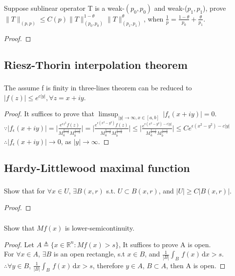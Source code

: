 \documentclass{amsart}
\theoremstyle{definition}
\theoremstyle{remark}
\numberwithin{equation}{section}
\begin{document}
\subsubsection{}
Suppose sublinear operator T is a weak-$(p_0,p_0)$ and weak-($p_1,p_1$), prove $\|T\|_(p,p)\leq C(p)\|T\|_{(p_0,p_0)}^{1-\theta}\|T\|_{(p_1,p_1)}^\theta$, when $\frac{1}{p}=\frac{1-\theta}{p_0}+\frac{\theta}{p_1}$.
\begin{proof}
\end{proof}
\subsection{Riesz-Thorin interpolation theorem}
\subsubsection{}
The assume f is finity in three-lines theorem can be reduced to $|f(z)|\leq e^{c|y|}, \forall z=x+iy$.
\begin{proof}
It suffices to prove that $\displaystyle\limsup_{|y|\to \infty, x\in [a,b]}\,|f_\epsilon(x+iy)|=0$.\\
$\displaystyle\because|f_\epsilon(x+iy)|=\bigg|\frac{e^{\epsilon z^2} f(z)}{M_a^{\frac{b-z}{b-a}}M_b^{\frac{z-a}{b-a}}}\bigg|=\bigg|\frac{e^{\epsilon (x^2-y^2)} f(z)}{M_a^{\frac{b-z}{b-a}}M_b^{\frac{z-a}{b-a}}}\bigg|\leq\bigg|\frac{e^{\epsilon (x^2-y^2)-c|y|}}{M_a^{\frac{b-z}{b-a}}M_b^{\frac{z-a}{b-a}}}\bigg|\leq C e^{\epsilon(x^2-y^2)-c|y|}$\\
$\therefore |f_\epsilon(x+iy)|\to 0$, as $|y|\to\infty$.
\end{proof}
\subsection{Hardy-Littlewood maximal function}
\subsubsection{}
Show that for $\forall x\in U$, $\exists B(x,r)$ s.t. $U\subset B(x,r)$, and $|U|\geq C|B(x,r)|$.
\begin{proof}
	
\end{proof}
\subsubsection{}
Show that $Mf(x)$ is lower-semicontinuity.
\begin{proof}
Let $A\triangleq\{x\in\mathbb{R}^n:Mf(x)>s\}$,
It suffices to prove A is open. \\
For $\forall x\in A$, $\exists B$ is an open rectangle, s.t $x\in B$, and $\frac{1}{|B|}\int_B\,f(x)\,\mathrm{d}x>s$.\\
$\therefore \forall y\in B$, $\frac{1}{|B|}\int_B\,f(x)\,\mathrm{d}x>s$, therefore $y\in A$, $B\subset A$, then A is open.
\end{proof}
\end{document}
